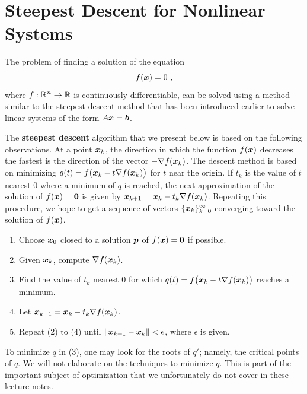 \section{Steepest Descent for Nonlinear Systems}

The problem of finding a solution of the equation
\begin{equation}
f(\bm{x})  = 0 \ ,
\end{equation}
where $\displaystyle f:\mathbb{R}^n \rightarrow \mathbb{R}$ is continuously
differentiable, can  be solved using a method similar to the steepest
descent method that has been introduced earlier to solve linear
systems of the form $A\bm{x}=\bm{b}$.

The {\bfseries steepest descent} algorithm
that we present below is based on the following observations.  At a
point $\bm{x}_k$, the direction in which the function $f(\bm{x})$
decreases the fastest is the direction of the vector
$-\nabla f(\bm{x}_k)$.  The descent method is based on minimizing
$\displaystyle q(t) = f\big(\bm{x}_k - t \nabla f(\bm{x}_k)\big)$
for $t$ near the origin.  If $t_k$ is the value of $t$ nearest $0$ where a
minimum of $q$ is reached, the next approximation of the solution of
$f(\bm{x})=\bm{0}$ is given by
$\displaystyle \bm{x}_{k+1} = \bm{x}_k - t_k \nabla f(\bm{x}_k)$.
Repeating this procedure, we hope to get a sequence of vectors
$\displaystyle \{\bm{x}_k\}_{k=0}^\infty$ converging toward the
solution of $f(\bm{x})$.

\begin{algo}
\begin{enumerate}
\item Choose $\bm{x}_0$ closed to a solution $\bm{p}$ of
$f(\bm{x}) = \bm{0}$ if possible.
\item Given $\bm{x}_k$, compute
$\displaystyle \nabla f(\bm{x}_k)$.
\item Find the value of $t_k$ nearest $0$ for which
$\displaystyle q(t) = f\big(\bm{x}_k - t \nabla f(\bm{x}_k)\big)$
reaches a minimum.
\item Let
$\displaystyle \bm{x}_{k+1} = \bm{x}_k - t_k \nabla f(\bm{x}_k)$.
\item  Repeat (2) to (4) until
$\| \bm{x}_{k+1} - \bm{x}_k \| < \epsilon$,
where $\epsilon$ is given.
\end{enumerate}
\end{algo}

To minimize $q$ in (3), one may look for the roots of $q'$;
namely, the critical points of $q$.  We will not elaborate on the
techniques to minimize $q$.  This is part of the important subject of
optimization that we unfortunately do not cover in these lecture notes.


